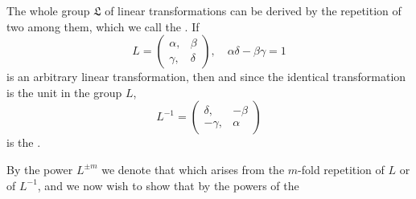 The whole group $\mathfrak{L}$ of linear transformations can be derived
by the repetition of two among them, which we call the .
If
\[
L = \begin{pmatrix}\alpha, & \beta\\\gamma, & \delta\end{pmatrix}, \quad \alpha\delta - \beta\gamma = 1
\]
is an arbitrary linear transformation, then
and since the identical transformation is the unit in the group $L$, %
\[
L^{-1} = \begin{pmatrix}\delta, & -\beta\\-\gamma, & \alpha\end{pmatrix}
\]
is the .

By the power $L^{\pm m}$ we denote that which arises from the $m$-fold
repetition of $L$ or of $L^{-1}$, and we now wish to show
that by the powers of the 


